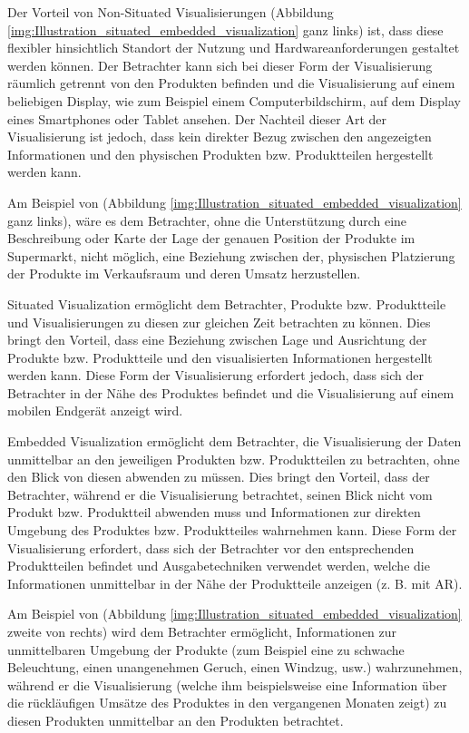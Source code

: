 Der Vorteil von Non-Situated Visualisierungen (Abbildung \ref{img:Illustration_situated_embedded_visualization} ganz links) ist, dass diese flexibler hinsichtlich Standort 
der Nutzung und Hardwareanforderungen gestaltet werden können. Der Betrachter kann sich bei dieser Form der Visualisierung räumlich getrennt von den Produkten befinden und die Visualisierung 
auf einem beliebigen Display, wie zum Beispiel einem Computerbildschirm, auf dem Display eines Smartphones oder Tablet ansehen. Der Nachteil dieser Art der Visualisierung ist jedoch, dass kein 
direkter Bezug zwischen den angezeigten Informationen und den physischen Produkten bzw. Produktteilen hergestellt werden kann. 

Am Beispiel von (Abbildung \ref{img:Illustration_situated_embedded_visualization} ganz links), wäre es dem Betrachter, ohne die Unterstützung durch eine Beschreibung oder Karte der Lage der genauen Position der Produkte im Supermarkt, nicht möglich, eine Beziehung zwischen der, physischen Platzierung der Produkte im Verkaufsraum und deren Umsatz herzustellen.

Situated Visualization ermöglicht dem Betrachter, Produkte bzw. Produktteile und Visualisierungen zu diesen zur gleichen Zeit betrachten zu können. Dies bringt den Vorteil, dass eine Beziehung 
zwischen Lage und Ausrichtung der Produkte bzw. Produktteile und den visualisierten Informationen hergestellt werden kann. Diese Form der Visualisierung erfordert jedoch, dass sich 
der Betrachter in der Nähe des Produktes befindet und die Visualisierung auf einem mobilen Endgerät anzeigt wird.

Embedded Visualization ermöglicht dem Betrachter, die Visualisierung der Daten unmittelbar an den jeweiligen Produkten bzw. Produktteilen zu betrachten, ohne den Blick von diesen abwenden zu müssen. 
Dies bringt den Vorteil, dass der Betrachter, während er die Visualisierung betrachtet, seinen Blick nicht vom Produkt bzw. Produktteil abwenden muss und Informationen zur direkten Umgebung des Produktes bzw. Produktteiles wahrnehmen kann. Diese Form der Visualisierung erfordert, dass sich der Betrachter vor den entsprechenden Produktteilen befindet und Ausgabetechniken verwendet werden, welche die Informationen unmittelbar in der Nähe der 
Produktteile anzeigen (z. B. mit AR).

Am Beispiel von (Abbildung \ref{img:Illustration_situated_embedded_visualization} zweite von rechts) wird dem Betrachter ermöglicht, Informationen zur unmittelbaren Umgebung der Produkte (zum Beispiel eine zu schwache Beleuchtung, einen unangenehmen Geruch, einen Windzug, usw.) wahrzunehmen, während er die Visualisierung (welche ihm beispielsweise eine Information über die rückläufigen Umsätze des Produktes in den vergangenen Monaten zeigt) zu diesen Produkten unmittelbar an den Produkten betrachtet.  

